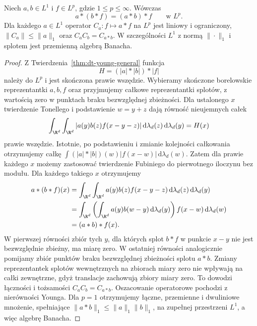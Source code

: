 \begin{stwierdzenie}
\label{prop:dt-convolution-l1-action}
Niech $a,b\in L^1$ i $f\in L^p$, gdzie $1\le p\le\infty$.
Wówczas
\[
 a*(b*f)=(a*b)*f\qquad\text{w }L^p.
\]
Dla każdego $a\in L^1$ operator $C_a:f\mapsto a*f$
na $L^p$ jest liniowy i ograniczony,
$\|C_a\|\le\|a\|_1$ oraz $C_aC_b=C_{a*b}$.
W szczególności $L^1$ z normą $\|\cdot\|_1$ i splotem
jest przemienną algebrą Banacha.
\end{stwierdzenie}
\begin{proof}
Z Twierdzenia~\ref{thm:dt-young-general} funkcja
\[
 H= (|a|*|b|)*|f|
\]
należy do $L^p$ i jest skończona prawie wszędzie.
Wybieramy skończone borelowskie reprezentantki
$a,b,f$ oraz przyjmujemy całkowe reprezentantki splotów,
z wartością zero w punktach braku bezwzględnej zbieżności.
Dla ustalonego $x$ twierdzenie Tonellego i podstawienie
$w=y+z$ dają równość nieujemnych całek
\[
 \int_{\R^d}\int_{\R^d}
 |a(y)b(z)f(x-y-z)|\,\mathrm d\lambda_d(z)
 \,\mathrm d\lambda_d(y)=H(x)
\]
prawie wszędzie. Istotnie, po podstawieniu i zmianie
kolejności całkowania otrzymujemy całkę
$\int (|a|*|b|)(w)|f(x-w)|\,\mathrm d\lambda_d(w)$.
Zatem dla prawie każdego $x$ możemy zastosować
twierdzenie Fubiniego do pierwotnego iloczynu bez modułu.
Dla każdego takiego $x$ otrzymujemy
\[
\begin{aligned}
 a*(b*f)(x)
 &=\int_{\R^d}\int_{\R^d}a(y)b(z)f(x-y-z)
 \,\mathrm d\lambda_d(z)\,\mathrm d\lambda_d(y)\\
 &=\int_{\R^d}\left(\int_{\R^d}a(y)b(w-y)
 \,\mathrm d\lambda_d(y)\right)f(x-w)
 \,\mathrm d\lambda_d(w)\\
 &=(a*b)*f(x).
\end{aligned}
\]
W pierwszej równości zbiór tych $y$, dla których
splot $b*f$ w punkcie $x-y$ nie jest bezwzględnie
zbieżny, ma miarę zero. W ostatniej równości
analogicznie pomijamy zbiór punktów braku bezwzględnej
zbieżności splotu $a*b$.
Zmiany reprezentantek splotów wewnętrznych na zbiorach
miary zero nie wpływają na całki zewnętrzne, gdyż
translacje zachowują zbiory miary zero.
To dowodzi łączności i tożsamości $C_aC_b=C_{a*b}$.
Oszacowanie operatorowe pochodzi z nierówności Younga.
Dla $p=1$ otrzymujemy łączne, przemienne i dwuliniowe
mnożenie, spełniające $\|a*b\|_1\le\|a\|_1\|b\|_1$,
na zupełnej przestrzeni $L^1$, a więc algebrę Banacha.
\end{proof}

